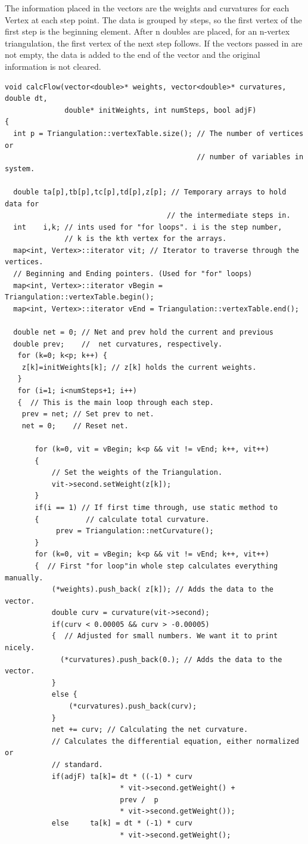 \documentclass[12pt]{article}
\begin{document}
\noindent The information placed in the vectors are the weights and curvatures for each Vertex at each step point. The data is grouped by steps, so the first vertex of the first step is the beginning element. After n doubles are placed, for an n-vertex triangulation, the first vertex of the next step follows. If the vectors passed in are not empty, the data is added to the end of the vector and the original information is not cleared.

\label{calcFlowCode}
\begin{verbatim}
void calcFlow(vector<double>* weights, vector<double>* curvatures, double dt, 
              double* initWeights, int numSteps, bool adjF)  
{
  int p = Triangulation::vertexTable.size(); // The number of vertices or 
                                             // number of variables in system.
                                         
  double ta[p],tb[p],tc[p],td[p],z[p]; // Temporary arrays to hold data for 
                                      // the intermediate steps in.
  int    i,k; // ints used for "for loops". i is the step number,
              // k is the kth vertex for the arrays.
  map<int, Vertex>::iterator vit; // Iterator to traverse through the vertices.
  // Beginning and Ending pointers. (Used for "for" loops)
  map<int, Vertex>::iterator vBegin = Triangulation::vertexTable.begin();
  map<int, Vertex>::iterator vEnd = Triangulation::vertexTable.end();
  
  double net = 0; // Net and prev hold the current and previous
  double prev;    //  net curvatures, respectively.
   for (k=0; k<p; k++) {
    z[k]=initWeights[k]; // z[k] holds the current weights.
   }
   for (i=1; i<numSteps+1; i++)
   {  // This is the main loop through each step.
    prev = net; // Set prev to net.
    net = 0;    // Reset net.
    
       for (k=0, vit = vBegin; k<p && vit != vEnd; k++, vit++)  
       {
           // Set the weights of the Triangulation.
           vit->second.setWeight(z[k]);
       }
       if(i == 1) // If first time through, use static method to 
       {           // calculate total curvature.
            prev = Triangulation::netCurvature();
       }
       for (k=0, vit = vBegin; k<p && vit != vEnd; k++, vit++) 
       {  // First "for loop"in whole step calculates everything manually.
           (*weights).push_back( z[k]); // Adds the data to the vector.
           double curv = curvature(vit->second);
           if(curv < 0.00005 && curv > -0.00005) 
           {  // Adjusted for small numbers. We want it to print nicely.
             (*curvatures).push_back(0.); // Adds the data to the vector.
           }
           else {
               (*curvatures).push_back(curv);
           }
           net += curv; // Calculating the net curvature.
           // Calculates the differential equation, either normalized or
           // standard.
           if(adjF) ta[k]= dt * ((-1) * curv 
                           * vit->second.getWeight() +
                           prev /  p
                           * vit->second.getWeight());
           else     ta[k] = dt * (-1) * curv 
                           * vit->second.getWeight();
           

\end{verbatim}
\end{document}

